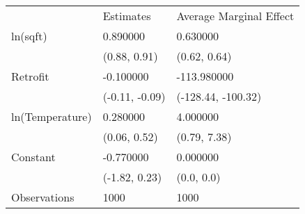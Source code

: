 \begin{tabular}{lll}
 & Estimates & Average Marginal Effect \\
ln(sqft) & 0.890000 & 0.630000 \\
  & (0.88, 0.91) & (0.62, 0.64) \\
Retrofit & -0.100000 & -113.980000 \\
  & (-0.11, -0.09) & (-128.44, -100.32) \\
ln(Temperature) & 0.280000 & 4.000000 \\
  & (0.06, 0.52) & (0.79, 7.38) \\
Constant & -0.770000 & 0.000000 \\
  & (-1.82, 0.23) & (0.0, 0.0) \\
Observations & 1000 & 1000 \\
\end{tabular}

